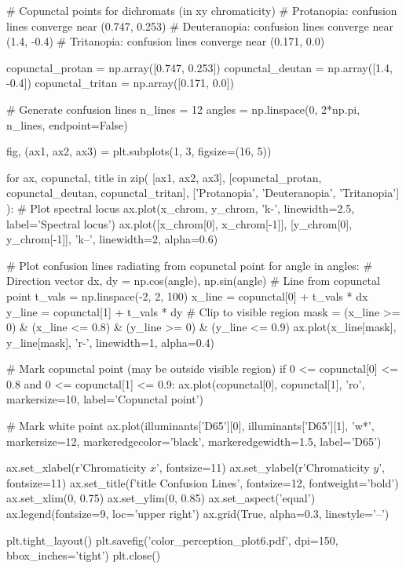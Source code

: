 \documentclass[11pt,a4paper]{article}
\begin{document}
\begin{pycode}
# Copunctal points for dichromats (in xy chromaticity)
# Protanopia: confusion lines converge near (0.747, 0.253)
# Deuteranopia: confusion lines converge near (1.4, -0.4)
# Tritanopia: confusion lines converge near (0.171, 0.0)

copunctal_protan = np.array([0.747, 0.253])
copunctal_deutan = np.array([1.4, -0.4])
copunctal_tritan = np.array([0.171, 0.0])

# Generate confusion lines
n_lines = 12
angles = np.linspace(0, 2*np.pi, n_lines, endpoint=False)

fig, (ax1, ax2, ax3) = plt.subplots(1, 3, figsize=(16, 5))

for ax, copunctal, title in zip(
    [ax1, ax2, ax3],
    [copunctal_protan, copunctal_deutan, copunctal_tritan],
    ['Protanopia', 'Deuteranopia', 'Tritanopia']
):
    # Plot spectral locus
    ax.plot(x_chrom, y_chrom, 'k-', linewidth=2.5, label='Spectral locus')
    ax.plot([x_chrom[0], x_chrom[-1]], [y_chrom[0], y_chrom[-1]],
            'k--', linewidth=2, alpha=0.6)

    # Plot confusion lines radiating from copunctal point
    for angle in angles:
        # Direction vector
        dx, dy = np.cos(angle), np.sin(angle)
        # Line from copunctal point
        t_vals = np.linspace(-2, 2, 100)
        x_line = copunctal[0] + t_vals * dx
        y_line = copunctal[1] + t_vals * dy
        # Clip to visible region
        mask = (x_line >= 0) & (x_line <= 0.8) & (y_line >= 0) & (y_line <= 0.9)
        ax.plot(x_line[mask], y_line[mask], 'r-', linewidth=1, alpha=0.4)

    # Mark copunctal point (may be outside visible region)
    if 0 <= copunctal[0] <= 0.8 and 0 <= copunctal[1] <= 0.9:
        ax.plot(copunctal[0], copunctal[1], 'ro', markersize=10,
                label='Copunctal point')

    # Mark white point
    ax.plot(illuminants['D65'][0], illuminants['D65'][1], 'w*',
            markersize=12, markeredgecolor='black', markeredgewidth=1.5,
            label='D65')

    ax.set_xlabel(r'Chromaticity $x$', fontsize=11)
    ax.set_ylabel(r'Chromaticity $y$', fontsize=11)
    ax.set_title(f'{title} Confusion Lines', fontsize=12, fontweight='bold')
    ax.set_xlim(0, 0.75)
    ax.set_ylim(0, 0.85)
    ax.set_aspect('equal')
    ax.legend(fontsize=9, loc='upper right')
    ax.grid(True, alpha=0.3, linestyle='--')

plt.tight_layout()
plt.savefig('color_perception_plot6.pdf', dpi=150, bbox_inches='tight')
plt.close()
\end{pycode}
\end{document}
